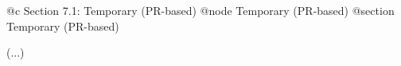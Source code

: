 @c Section 7.1: Temporary (PR-based)
@node Temporary (PR-based)
@section Temporary (PR-based)

(...)
